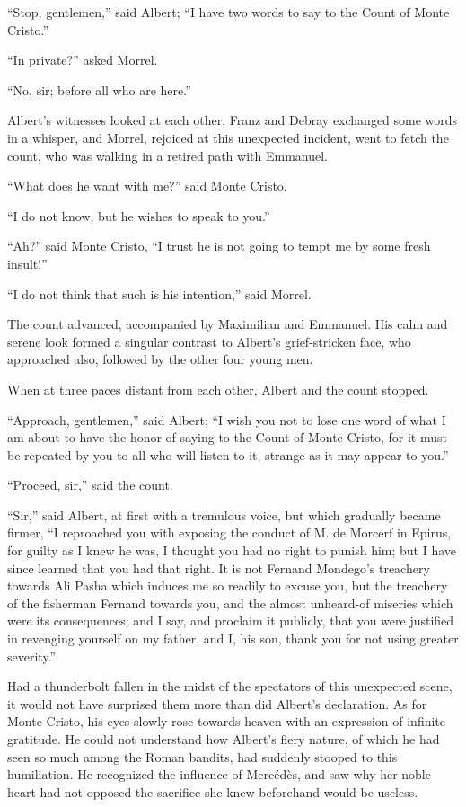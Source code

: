 “Stop, gentlemen,” said Albert; “I have two words to say to the Count
of Monte Cristo.”

“In private?” asked Morrel.

“No, sir; before all who are here.”

Albert’s witnesses looked at each other. Franz and Debray exchanged
some words in a whisper, and Morrel, rejoiced at this unexpected
incident, went to fetch the count, who was walking in a retired path
with Emmanuel.

“What does he want with me?” said Monte Cristo.

“I do not know, but he wishes to speak to you.”

“Ah?” said Monte Cristo, “I trust he is not going to tempt me by some
fresh insult!”

“I do not think that such is his intention,” said Morrel.

The count advanced, accompanied by Maximilian and Emmanuel. His calm
and serene look formed a singular contrast to Albert’s grief-stricken
face, who approached also, followed by the other four young men.

When at three paces distant from each other, Albert and the count
stopped.

“Approach, gentlemen,” said Albert; “I wish you not to lose one word of
what I am about to have the honor of saying to the Count of Monte
Cristo, for it must be repeated by you to all who will listen to it,
strange as it may appear to you.”

“Proceed, sir,” said the count.

“Sir,” said Albert, at first with a tremulous voice, but which
gradually became firmer, “I reproached you with exposing the conduct of
M. de Morcerf in Epirus, for guilty as I knew he was, I thought you had
no right to punish him; but I have since learned that you had that
right. It is not Fernand Mondego’s treachery towards Ali Pasha which
induces me so readily to excuse you, but the treachery of the fisherman
Fernand towards you, and the almost unheard-of miseries which were its
consequences; and I say, and proclaim it publicly, that you were
justified in revenging yourself on my father, and I, his son, thank you
for not using greater severity.”

Had a thunderbolt fallen in the midst of the spectators of this
unexpected scene, it would not have surprised them more than did
Albert’s declaration. As for Monte Cristo, his eyes slowly rose towards
heaven with an expression of infinite gratitude. He could not
understand how Albert’s fiery nature, of which he had seen so much
among the Roman bandits, had suddenly stooped to this humiliation. He
recognized the influence of Mercédès, and saw why her noble heart had
not opposed the sacrifice she knew beforehand would be useless.

